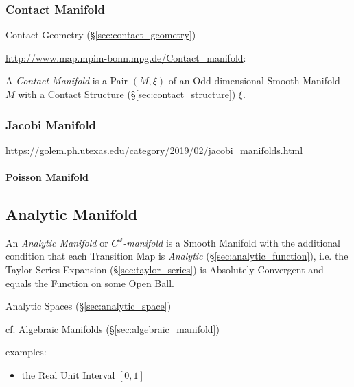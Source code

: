 \subsubsection{Contact Manifold}\label{sec:contact_manifold}

\fist Contact Geometry (\S\ref{sec:contact_geometry})

\url{http://www.map.mpim-bonn.mpg.de/Contact_manifold}:

A \emph{Contact Manifold} is a Pair $(M,\xi)$ of an Odd-dimensional Smooth
Manifold $M$ with a Contact Structure (\S\ref{sec:contact_structure}) $\xi$.



\subsubsection{Jacobi Manifold}\label{sec:jacobi_manifold}

\url{https://golem.ph.utexas.edu/category/2019/02/jacobi_manifolds.html}



\paragraph{Poisson Manifold}\label{sec:poisson_manifold}\hfill



\subsection{Analytic Manifold}\label{sec:analytic_manifold}

An \emph{Analytic Manifold} or \emph{$C^\omega$-manifold} is a Smooth Manifold
with the additional condition that each Transition Map is \emph{Analytic}
(\S\ref{sec:analytic_function}), i.e. the Taylor Series Expansion
(\S\ref{sec:taylor_series}) is Absolutely Convergent and equals the Function on
some Open Ball.

\fist Analytic Spaces (\S\ref{sec:analytic_space})

cf. Algebraic Manifolds (\S\ref{sec:algebraic_manifold})

examples:
\begin{itemize}
  \item the Real Unit Interval $[0,1]$
\end{itemize}



